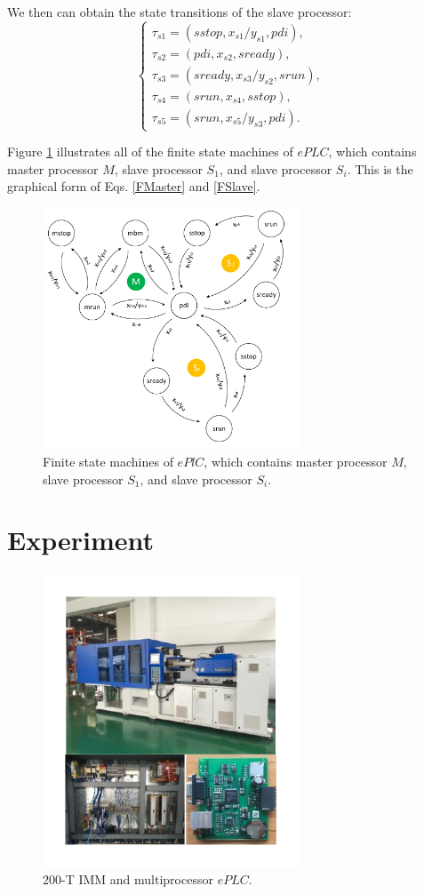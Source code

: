 \documentclass[journal,UTF8]{IEEEtran}
\begin{document}
	
	We then can obtain the state transitions of the slave processor:
	\begin{equation}
	\left\{
	\begin{array}{l}
	\tau_{s1} = (sstop, x_{s1}/y_{s1}, pdi),\\
	\tau_{s2} = (pdi, x_{s2}, sready),\\
	\tau_{s3} = (sready, x_{s3}/y_{s2}, srun),\\
	\tau_{s4} = (srun, x_{s4}, sstop),\\
	\tau_{s5} = (srun, x_{s5}/y_{s3}, pdi).
	\end{array}
	\right.
	\end{equation}
	
	Figure \ref{fig:state} illustrates all of the finite state machines of $ePLC$, which contains master processor $M$, slave processor $S_1$, and slave processor $S_i$. This is the graphical form of Eqs. \ref{FMaster} and \ref{FSlave}. 
	\begin{figure}
		\centering
		\includegraphics[width=3in]{fig/state.pdf}
		\caption{ Finite state machines of $ePlC$, which contains master processor $M$, slave processor $S_1$, and slave processor $S_i$.}
		\label{fig:state}
	\end{figure}
	\section{Experiment}
	\label{Experiment}
	
	\begin{figure}
		\centering
		\includegraphics[width=3in]{fig/FIG10.pdf}
		\caption{200-T IMM and multiprocessor $ePLC$.}
		\label{fig:IMM}
	\end{figure}
	
\end{document}
